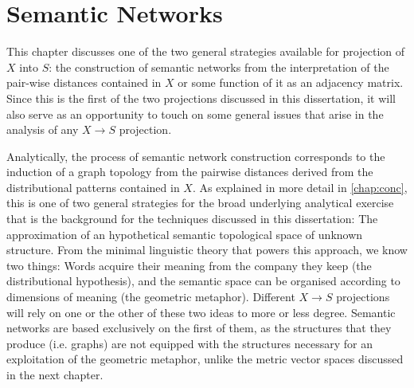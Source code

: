 \chapter{Semantic Networks}
\label{chap:semnet}

This chapter discusses one of the two general strategies available for projection of $X$ into $S$: the construction of semantic networks from the interpretation of the pair-wise distances contained in $X$ or some function of it as an adjacency matrix.
Since this is the first of the two projections discussed in this dissertation, it will also serve as an opportunity to touch on some general issues that arise in the analysis of any $X \rightarrow S$ projection.

Analytically, the process of semantic network construction corresponds to the induction of a graph topology from the pairwise distances derived from the distributional patterns contained in $X$.
As explained in more detail in \autoref{chap:conc}, this is one of two general strategies for the broad underlying analytical exercise that is the background for the techniques discussed in this dissertation:
The approximation of an hypothetical semantic topological space of unknown structure.
From the minimal linguistic theory that powers this approach, we know two things:
Words acquire their meaning from the company they keep (the distributional hypothesis), and the semantic space can be organised according to dimensions of meaning (the geometric metaphor).
Different $X \rightarrow S$ projections will rely on one or the other of these two ideas to more or less degree.
Semantic networks are based exclusively on the first of them, as the structures that they produce (i.e. graphs) are not equipped with the structures necessary for an exploitation of the geometric metaphor, unlike the metric vector spaces discussed in the next chapter.

